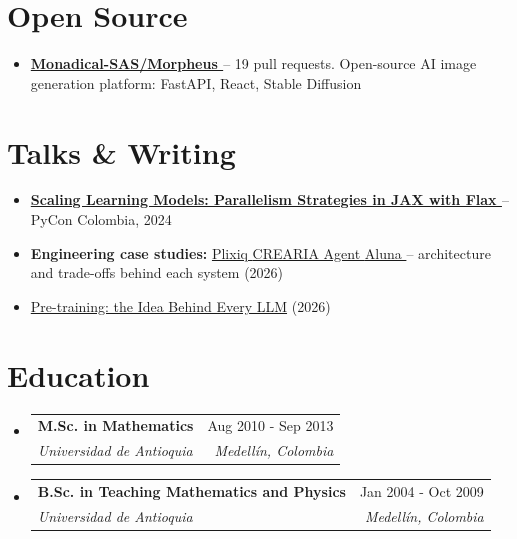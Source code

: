 \documentclass[letterpaper,10pt]{article}
\makeatletter
\newcommand{\resumeSubheading}[4]{
  \vspace{-2pt}
  \item[]
  \begin{tabular*}{\textwidth}{@{\extracolsep{\fill}}l r}
    \textbf{#1} & #2 \\
    \textit{#3} & \textit{#4} \\
  \end{tabular*}
  \vspace{-5pt}
}
\newcommand{\normalfaExternalLink}{{\mdseries\faExternalLink}}
\newcommand{\normalfaYoutube}{{\mdseries\faYoutube}}
\makeatother
\begin{document}
\section{Open Source}
\begin{itemize}[leftmargin=*, itemsep=0pt]
    \item \textbf{\href{https://github.com/Monadical-SAS/Morpheus}{Monadical-SAS/Morpheus \normalfaExternalLink}} -- 19 pull requests. Open-source AI image generation platform: FastAPI, React, Stable Diffusion
\end{itemize}

\section{Talks \& Writing}
\begin{itemize}[leftmargin=*, itemsep=0pt]
    \item \textbf{\href{https://www.youtube.com/watch?v=m4hP1soE414}{Scaling Learning Models: Parallelism Strategies in JAX with Flax \normalfaYoutube}} -- PyCon Colombia, 2024
    \item \textbf{Engineering case studies:} \href{https://www.asanchezyali.com/blog/case-studies/plixiq}{Plixiq \normalfaExternalLink} \textperiodcentered{} \href{https://www.asanchezyali.com/blog/case-studies/crearia-agent}{CREARIA Agent \normalfaExternalLink} \textperiodcentered{} \href{https://www.asanchezyali.com/blog/case-studies/aluna}{Aluna \normalfaExternalLink} -- architecture and trade-offs behind each system (2026)
    \item \href{https://medium.com/@asanchezyali/pre-training-the-idea-behind-every-llm-adae91f0300f}{Pre-training: the Idea Behind Every LLM} (2026)
\end{itemize}

\section{Education}
\begin{itemize}[leftmargin=0pt, itemindent=0pt, label={}]
\resumeSubheading
{M.Sc. in Mathematics}{Aug 2010 - Sep 2013}
{Universidad de Antioquia}{Medell\'in, Colombia}
\resumeSubheading
{B.Sc. in Teaching Mathematics and Physics}{Jan 2004 - Oct 2009}
{Universidad de Antioquia}{Medell\'in, Colombia}
\end{itemize}
\end{document}
